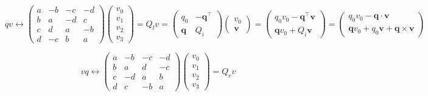 \documentclass[
]{book}
\theoremstyle{definition}
\theoremstyle{definition}
\theoremstyle{definition}
\theoremstyle{definition}
\theoremstyle{remark}
\begin{document}
\[
qv\leftrightarrow\begin{pmatrix}a & -b & -c & -d\\
b & a & -d & c\\
c & d & a & -b\\
d & -c & b & a
\end{pmatrix}\begin{pmatrix}v_{{\scriptscriptstyle 0}}\\
v_{{\scriptscriptstyle 1}}\\
v_{{\scriptscriptstyle 2}}\\
v_{{\scriptscriptstyle 3}}
\end{pmatrix}=Q_{{\scriptscriptstyle l}}v=\begin{pmatrix}q_{{\scriptscriptstyle 0}} & -\boldsymbol{q}^{\intercal}\\
\boldsymbol{q} & Q_{{\scriptscriptstyle i}}
\end{pmatrix}\begin{pmatrix}v_{{\scriptscriptstyle 0}}\\
\boldsymbol{v}
\end{pmatrix}=\begin{pmatrix}q_{{\scriptscriptstyle 0}}v_{{\scriptscriptstyle 0}}-\boldsymbol{q}^{\intercal}\boldsymbol{v}\\
\boldsymbol{q}v_{{\scriptscriptstyle 0}}+Q_{{\scriptscriptstyle i}}\boldsymbol{v}
\end{pmatrix}=\begin{pmatrix}q_{{\scriptscriptstyle 0}}v_{{\scriptscriptstyle 0}}-\boldsymbol{q}\cdot\boldsymbol{v}\\
\boldsymbol{q}v_{{\scriptscriptstyle 0}}+q_{{\scriptscriptstyle 0}}\boldsymbol{v}+\boldsymbol{q}\times\boldsymbol{v}
\end{pmatrix}
\]

\[
vq\leftrightarrow\begin{pmatrix}a & -b & -c & -d\\
b & a & d & -c\\
c & -d & a & b\\
d & c & -b & a
\end{pmatrix}\begin{pmatrix}v_{{\scriptscriptstyle 0}}\\
v_{{\scriptscriptstyle 1}}\\
v_{{\scriptscriptstyle 2}}\\
v_{{\scriptscriptstyle 3}}
\end{pmatrix}=Q_{{\scriptscriptstyle r}}v
\]
\end{document}

